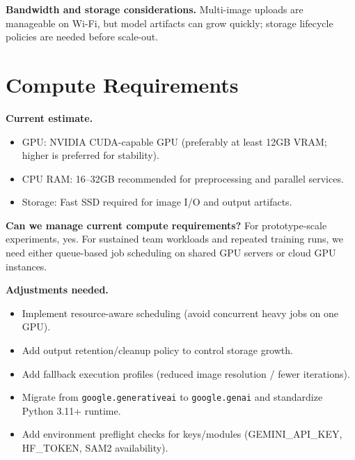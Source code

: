 \documentclass[10pt,twocolumn,letterpaper]{article}
\begin{document}
\textbf{Bandwidth and storage considerations.} Multi-image uploads are manageable on Wi-Fi, but model artifacts can grow quickly; storage lifecycle policies are needed before scale-out.

\section{Compute Requirements}
\textbf{Current estimate.}
\begin{itemize}[leftmargin=*]
    \item GPU: NVIDIA CUDA-capable GPU (preferably at least 12GB VRAM; higher is preferred for stability).
    \item CPU RAM: 16--32GB recommended for preprocessing and parallel services.
    \item Storage: Fast SSD required for image I/O and output artifacts.
\end{itemize}

\textbf{Can we manage current compute requirements?} For prototype-scale experiments, yes. For sustained team workloads and repeated training runs, we need either queue-based job scheduling on shared GPU servers or cloud GPU instances.

\textbf{Adjustments needed.}
\begin{itemize}[leftmargin=*]
    \item Implement resource-aware scheduling (avoid concurrent heavy jobs on one GPU).
    \item Add output retention/cleanup policy to control storage growth.
    \item Add fallback execution profiles (reduced image resolution / fewer iterations).
    \item Migrate from \texttt{google.generativeai} to \texttt{google.genai} and standardize Python 3.11+ runtime.
    \item Add environment preflight checks for keys/modules (GEMINI\_API\_KEY, HF\_TOKEN, SAM2 availability).
\end{itemize}
\end{document}
